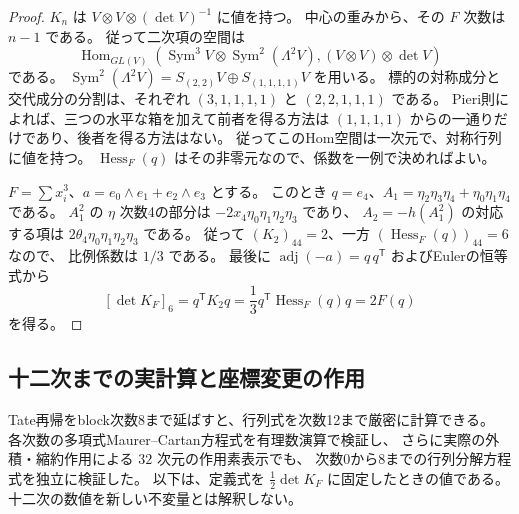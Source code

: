 \documentclass[a4paper,11pt]{ltjsarticle}
\theoremstyle{definition}
\begin{document}
\begin{proof}
$K_n$ は $V\otimes V\otimes(\det V)^{-1}$ に値を持つ。
中心の重みから、その $F$ 次数は $n-1$ である。
従って二次項の空間は
\[
 \operatorname{Hom}_{GL(V)}
 \left(\operatorname{Sym}^3V\otimes
       \operatorname{Sym}^2(\Lambda^2V),
       (V\otimes V)\otimes\det V\right)
\]
である。
$\operatorname{Sym}^2(\Lambda^2V)=S_{(2,2)}V\oplus S_{(1,1,1,1)}V$ を用いる。
標的の対称成分と交代成分の分割は、それぞれ
$(3,1,1,1,1)$ と $(2,2,1,1,1)$ である。
Pieri則によれば、三つの水平な箱を加えて前者を得る方法は
$(1,1,1,1)$ からの一通りだけであり、後者を得る方法はない。
従ってこのHom空間は一次元で、対称行列に値を持つ。
$\operatorname{Hess}_F(q)$ はその非零元なので、係数を一例で決めればよい。

$F=\sum x_i^3$、$a=e_0\wedge e_1+e_2\wedge e_3$ とする。
このとき $q=e_4$、$A_1=\eta_2\eta_3\eta_4+\eta_0\eta_1\eta_4$ である。
$A_1^2$ の $\eta$ 次数4の部分は $-2x_4\eta_0\eta_1\eta_2\eta_3$ であり、
$A_2=-h(A_1^2)$ の対応する項は
$2\theta_4\eta_0\eta_1\eta_2\eta_3$ である。
従って $(K_2)_{44}=2$、一方 $(\operatorname{Hess}_F(q))_{44}=6$ なので、
比例係数は $1/3$ である。
最後に $\operatorname{adj}(-a)=q\,q^{\mathsf T}$ およびEulerの恒等式から
\[
 [\det K_F]_6=q^{\mathsf T}K_2q
 =\frac13q^{\mathsf T}\operatorname{Hess}_F(q)q=2F(q)
\]
を得る。
\end{proof}

\subsection{十二次までの実計算と座標変更の作用}
\label{subsec:v9-twelfth-jet}

Tate再帰をblock次数8まで延ばすと、行列式を次数12まで厳密に計算できる。
各次数の多項式Maurer--Cartan方程式を有理数演算で検証し、
さらに実際の外積・縮約作用による $32$ 次元の作用素表示でも、
次数0から8までの行列分解方程式を独立に検証した。
以下は、定義式を $\frac12\det K_F$ に固定したときの値である。
十二次の数値を新しい不変量とは解釈しない。
\end{document}
